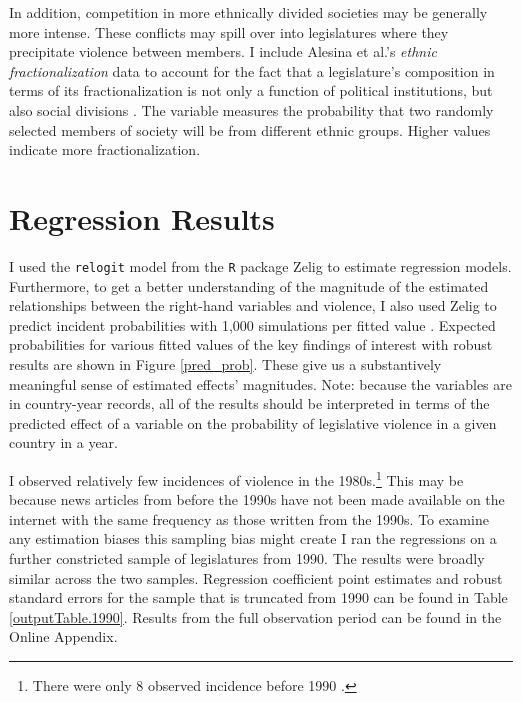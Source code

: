 \documentclass[a4paper]{article}\usepackage[]{graphicx}\usepackage[]{color}
\begin{document}
In addition, competition in more ethnically divided societies may be generally more intense. These conflicts may spill over into legislatures where they precipitate violence between members. I include Alesina et al.'s \citeyearpar{Alesina2003} {\emph{ethnic fractionalization}} data to account for the fact that a legislature's composition in terms of its fractionalization is not only a function of political institutions, but also social divisions \citep{Neto1997, Mozaffar2003}. The variable measures the probability that two randomly selected members of society will be from different ethnic groups. Higher values indicate more fractionalization.




\section*{Regression Results}

I used the {\tt{relogit}} model from the {\tt{R}} package Zelig \citep{IMAIKingZelig2008} to estimate regression models. Furthermore, to get a better understanding of the magnitude of the estimated relationships between the right-hand variables and violence, I also used Zelig to predict incident probabilities with 1,000 simulations per fitted value \citep[]{King2002}. Expected probabilities for various fitted values of the key findings of interest with robust results are shown in Figure \ref{pred_prob}. These give us a substantively meaningful sense of estimated effects' magnitudes. Note: because the variables are in country-year records, all of the results should be interpreted in terms of the predicted effect of a variable on the probability of legislative violence in a given country in a year.

I observed relatively few incidences of violence in the 1980s.\footnote{There were only 8 observed incidence before 1990 .} This may be because news articles from before the 1990s have not been made available on the internet with the same frequency as those written from the 1990s. To examine any estimation biases this sampling bias might create I ran the regressions on a further constricted sample of  legislatures from 1990. The results were broadly similar across the two samples. Regression coefficient point estimates and robust standard errors for the sample that is truncated from 1990 can be found in Table \ref{outputTable.1990}. Results from the full observation period can be found in the Online Appendix. 
\end{document}
